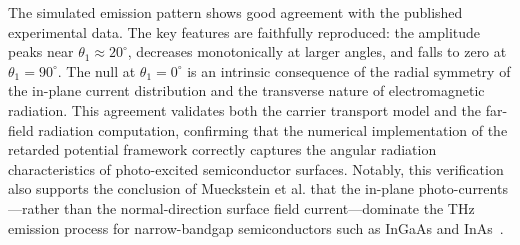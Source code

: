 \documentclass[12pt]{interim_report}
\begin{document}
The simulated emission pattern shows good agreement with the published experimental data. The key features are faithfully reproduced: the amplitude peaks near $\theta_1 \approx 20^{\circ}$, decreases monotonically at larger angles, and falls to zero at $\theta_1 = 90^{\circ}$. The null at $\theta_1 = 0^{\circ}$ is an intrinsic consequence of the radial symmetry of the in-plane current distribution and the transverse nature of electromagnetic radiation. This agreement validates both the carrier transport model and the far-field radiation computation, confirming that the numerical implementation of the retarded potential framework correctly captures the angular radiation characteristics of photo-excited semiconductor surfaces. Notably, this verification also supports the conclusion of Mueckstein et al. that the in-plane photo-currents—rather than the normal-direction surface field current—dominate the THz emission process for narrow-bandgap semiconductors such as InGaAs and InAs~\cite{Mueckstein2015}.

\newpage


\end{document}
